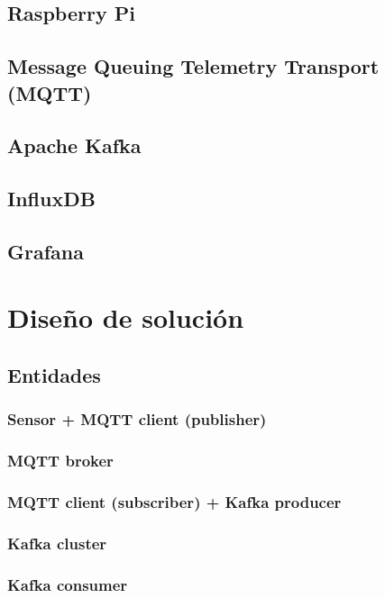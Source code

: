\documentclass[12pt, a4paper]{article}
\begin{document}
        \subsection{Raspberry Pi}

        \subsection{Message Queuing Telemetry Transport (MQTT)}
        
        \subsection{Apache Kafka}
        
        \subsection{InfluxDB}
        
        \subsection{Grafana}
        


        \section{Diseño de solución}

        \subsection{Entidades}

        \subsubsection{Sensor + MQTT client (publisher)}
        \subsubsection{MQTT broker}
        \subsubsection{MQTT client (subscriber) + Kafka producer}
        \subsubsection{Kafka cluster}
        \subsubsection{Kafka consumer}
\end{document}
